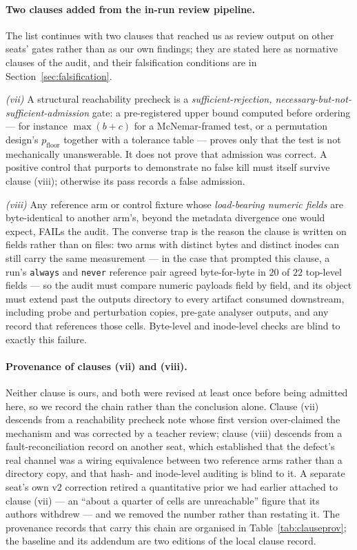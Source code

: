 \documentclass{article}
\begin{document}
\paragraph{Two clauses added from the in-run review pipeline.}
The list continues with two clauses that reached us as review output on other seats' gates
rather than as our own findings; they are stated here as normative clauses of the audit, and
their falsification conditions are in Section~\ref{sec:falsification}.

\emph{(vii)} A structural reachability precheck is a
\emph{sufficient-rejection, necessary-but-not-sufficient-admission} gate: a pre-registered
upper bound computed before ordering --- for instance $\max(b+c)$ for a McNemar-framed test,
or a permutation design's $p_{\mathrm{floor}}$ together with a tolerance table --- proves only
that the test is not mechanically unanswerable. It does not prove that admission was correct.
A positive control that purports to demonstrate no false kill must itself survive clause
(viii); otherwise its pass records a false admission.

\emph{(viii)} Any reference arm or control fixture whose \emph{load-bearing numeric fields}
are byte-identical to another arm's, beyond the metadata divergence one would expect, FAILs
the audit. The converse trap is the reason the clause is written on fields rather than on
files: two arms with distinct bytes and distinct inodes can still carry the same measurement
--- in the case that prompted this clause, a run's \texttt{always} and \texttt{never}
reference pair agreed byte-for-byte in $20$ of $22$ top-level fields --- so the audit must
compare numeric payloads field by field, and its object must extend past the outputs
directory to every artifact consumed downstream, including probe and perturbation copies,
pre-gate analyser outputs, and any record that references those cells. Byte-level and
inode-level checks are blind to exactly this failure.

\paragraph{Provenance of clauses (vii) and (viii).}
Neither clause is ours, and both were revised at least once before being admitted here, so we
record the chain rather than the conclusion alone. Clause (vii) descends from a reachability
precheck note whose first version over-claimed the mechanism and was corrected by a teacher
review; clause (viii) descends from a fault-reconciliation record on another seat, which
established that the defect's real channel was a wiring equivalence between two reference arms
rather than a directory copy, and that hash- and inode-level auditing is blind to it. A
separate seat's own v2 correction retired a quantitative prior we had earlier attached to
clause (vii) --- an ``about a quarter of cells are unreachable'' figure that its authors
withdrew --- and we removed the number rather than restating it. The provenance records that
carry this chain are organised in Table~\ref{tab:clauseprov}; the baseline and its addendum
are two editions of the local clause record.
\end{document}
